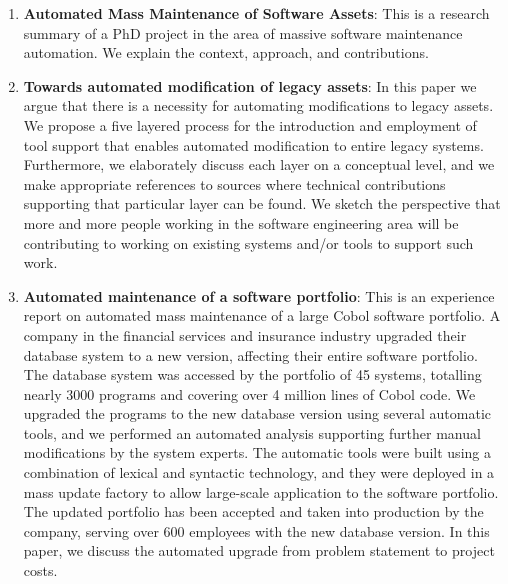 \begin{englishtext}
\begin{enumerate}
    \item \textbf{Automated Mass Maintenance of Software Assets}: This is a
    research summary of a PhD project in the area of massive software
    maintenance automation. We explain the context, approach, and contributions.
    \cite{massMaintenance}

    \item \textbf{Towards automated modification of legacy assets}: In this
    paper we argue that there is a necessity for automating modifications to
    legacy assets. We propose a five layered process for the introduction and
    employment of tool support that enables automated modification to entire
    legacy systems. Furthermore, we elaborately discuss each layer on a
    conceptual level, and we make appropriate references to sources where
    technical contributions supporting that particular layer can be found. We
    sketch the perspective that more and more people working in the software
    engineering area will be contributing to working on existing systems and/or
    tools to support such work. \cite{legacyAssets}

    \item \textbf{Automated maintenance of a software portfolio}: This is an
    experience report on automated mass maintenance of a large Cobol software
    portfolio. A company in the financial services and insurance industry
    upgraded their database system to a new version, affecting their entire
    software portfolio. The database system was accessed by the portfolio of 45
    systems, totalling nearly 3000 programs and covering over 4 million lines of
    Cobol code. We upgraded the programs to the new database version using
    several automatic tools, and we performed an automated analysis supporting
    further manual modifications by the system experts. The automatic tools were
    built using a combination of lexical and syntactic technology, and they were
    deployed in a mass update factory to allow large-scale application to the
    software portfolio. The updated portfolio has been accepted and taken into
    production by the company, serving over 600 employees with the new database
    version. In this paper, we discuss the automated upgrade from problem
    statement to project costs. \cite{softwarePortfolio}


\end{enumerate}
\end{englishtext}
